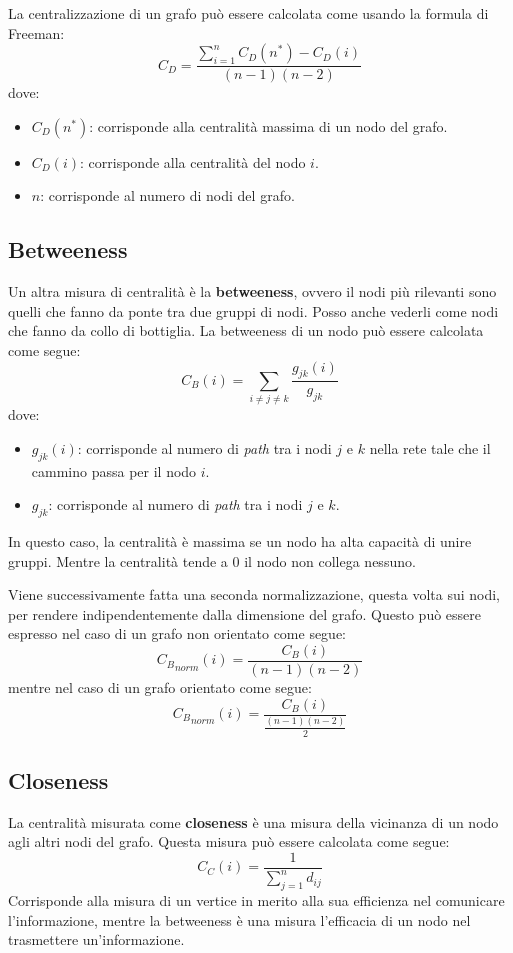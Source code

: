 La centralizzazione di un grafo può essere calcolata come usando la formula di Freeman:
\begin{equation}
    C_D = \frac{\sum_{i=1}^{n} C_D(n^\ast) - C_D(i)}{(n - 1)(n - 2)}
\end{equation}
dove:
\begin{itemize}
    \item $C_D(n^\ast)$: corrisponde alla centralità massima di un nodo del grafo.
    \item $C_D(i)$: corrisponde alla centralità del nodo $i$.
    \item $n$: corrisponde al numero di nodi del grafo.
\end{itemize}
\subsection{Betweeness}
Un altra misura di centralità è la \textbf{betweeness}, ovvero il nodi più
rilevanti sono quelli che fanno da ponte tra due gruppi di nodi. Posso anche
vederli come nodi che fanno da collo di bottiglia. La betweeness di un nodo
può essere calcolata come segue:
\begin{equation}
    C_B(i) = \sum_{i \neq j \neq k} \frac{g_{jk}(i)}{g_{jk}}
\end{equation}
dove:
\begin{itemize}
    \item $g_{jk}(i)$: corrisponde al numero di \textit{path} tra i
          nodi $j$ e $k$ nella rete tale che il cammino passa per il nodo $i$.
    \item $g_{jk}$: corrisponde al numero di \textit{path} tra i nodi
          $j$ e $k$.
\end{itemize}
In questo caso, la centralità è massima se un nodo ha alta capacità di unire
gruppi. Mentre la centralità tende a $0$ il nodo non collega nessuno.

Viene successivamente fatta una seconda normalizzazione, questa volta sui nodi,
per rendere indipendentemente dalla dimensione del grafo. Questo può essere
espresso nel caso di un grafo non orientato come segue:
\begin{equation}
    {C_B}_{norm}(i) = \frac{C_B(i)}{(n - 1)(n - 2)}
\end{equation}
mentre nel caso di un grafo orientato come segue:
\begin{equation}
    {C_B}_{norm}(i) = \frac{C_B(i)}{\frac{(n - 1)(n - 2)}{2}}
\end{equation}
\subsection{Closeness}
La centralità misurata come \textbf{closeness} è una misura della vicinanza di
un nodo agli altri nodi del grafo. Questa misura può essere calcolata come segue:
\begin{equation}
    C_C(i) = \frac{1}{\sum_{j=1}^{n} d_{ij}}
\end{equation}
Corrisponde alla misura di un vertice in merito alla sua efficienza nel
comunicare l'informazione, mentre la betweeness è una misura l'efficacia di un
nodo nel trasmettere un'informazione.

